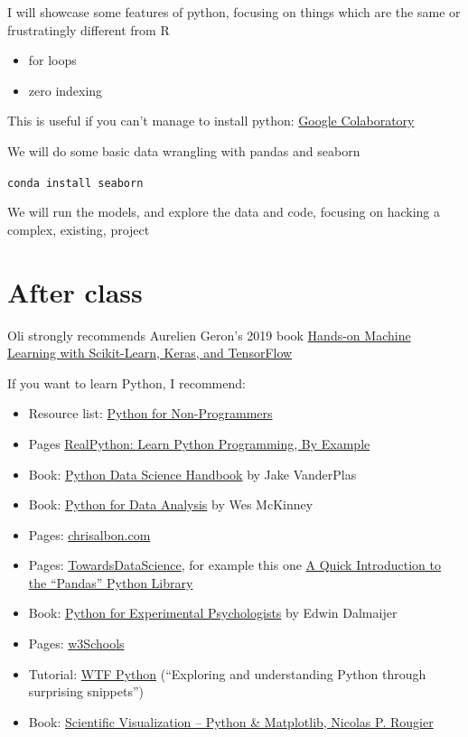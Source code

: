 \documentclass[
]{book}
\providecommand{\tightlist}{%
  \setlength{\itemsep}{0pt}\setlength{\parskip}{0pt}}
\begin{document}
I will showcase some features of python, focusing on things which are the same or frustratingly different from R

\begin{itemize}
\tightlist
\item
  for loops
\item
  zero indexing
\end{itemize}

This is useful if you can't manage to install python: \href{https://colab.research.google.com/}{Google Colaboratory}

We will do some basic data wrangling with pandas and seaborn

\texttt{conda\ install\ seaborn}

We will run the models, and explore the data and code, focusing on hacking a complex, existing, project

\hypertarget{after-class}{%
\section{After class}\label{after-class}}

Oli strongly recommends Aurelien Geron's 2019 book \href{https://www.oreilly.com/library/view/hands-on-machine-learning/9781492032632/}{Hands-on Machine Learning with Scikit-Learn, Keras, and TensorFlow}

If you want to learn Python, I recommend:

\begin{itemize}
\tightlist
\item
  Resource list: \href{https://wiki.python.org/moin/BeginnersGuide/NonProgrammers}{Python for Non-Programmers}
\item
  Pages \href{https://realpython.com/start-here/}{RealPython: Learn Python Programming, By Example}
\item
  Book: \href{https://jakevdp.github.io/PythonDataScienceHandbook/}{Python Data Science Handbook} by Jake VanderPlas
\item
  Book: \href{https://wesmckinney.com/pages/book.html}{Python for Data Analysis} by Wes McKinney
\item
  Pages: \href{https://chrisalbon.com/}{chrisalbon.com}
\item
  Pages: \href{https://towardsdatascience.com}{TowardsDataScience}, for example this one \href{https://towardsdatascience.com/a-quick-introduction-to-the-pandas-python-library-f1b678f34673}{A Quick Introduction to the ``Pandas'' Python Library}
\item
  Book: \href{http://www.pygaze.org/pep/}{Python for Experimental Psychologists} by Edwin Dalmaijer
\item
  Pages: \href{https://www.w3schools.com/python/default.asp}{w3Schools}
\item
  Tutorial: \href{https://github.com/satwikkansal/wtfpython}{WTF Python} (``Exploring and understanding Python through surprising snippets'')
\item
  Book: \href{https://github.com/rougier/scientific-visualization-book}{Scientific Visualization -- Python \& Matplotlib, Nicolas P. Rougier}
\end{itemize}
\end{document}
